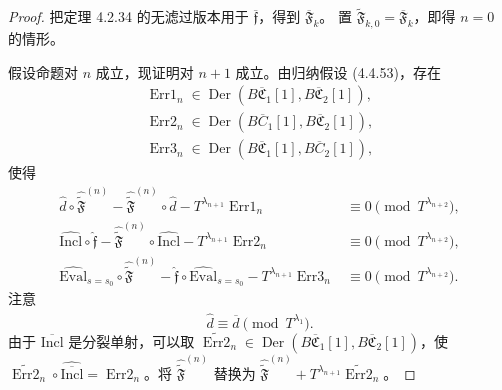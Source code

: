 \begin{proof}
把定理 4.2.34 的无滤过版本用于
$\overline{\mathfrak f}$，得到 $\overline{\mathfrak F}_k$。
置 $\widetilde{\mathfrak F}_{k,0}=\overline{\mathfrak F}_k$，即得
$n=0$ 的情形。

假设命题对 $n$ 成立，现证明对 $n+1$ 成立。由归纳假设
(4.4.53)，存在
\[
 \begin{gathered}
 \operatorname{Err1}_n\in
 \operatorname{Der}(B\overline{\mathfrak C}_1[1],
 B\overline{\mathfrak C}_2[1]),\\
 \operatorname{Err2}_n\in
 \operatorname{Der}(B\overline C_1[1],
 B\overline{\mathfrak C}_2[1]),\\
 \operatorname{Err3}_n\in
 \operatorname{Der}(B\overline{\mathfrak C}_1[1],
 B\overline C_2[1]),
 \end{gathered}
\]
使得
\begin{align}
 \widehat d\circ\widehat{\widetilde{\mathfrak F}}^{(n)}
 -\widehat{\widetilde{\mathfrak F}}^{(n)}\circ\widehat d
 -T^{\lambda_{n+1}}\operatorname{Err1}_n
 &\equiv0\pmod{T^{\lambda_{n+2}}},
 \tag{4.4.54.1}\label{eq:4-4-54-1}\\
 \widehat{\mathrm{Incl}}\circ\widehat{\mathfrak f}
 -\widehat{\widetilde{\mathfrak F}}^{(n)}
 \circ\widehat{\mathrm{Incl}}
 -T^{\lambda_{n+1}}\operatorname{Err2}_n
 &\equiv0\pmod{T^{\lambda_{n+2}}},
 \tag{4.4.54.2}\label{eq:4-4-54-2}\\
 \widehat{\mathrm{Eval}}_{s=s_0}
 \circ\widehat{\widetilde{\mathfrak F}}^{(n)}
 -\widehat{\mathfrak f}\circ
 \widehat{\mathrm{Eval}}_{s=s_0}
 -T^{\lambda_{n+1}}\operatorname{Err3}_n
 &\equiv0\pmod{T^{\lambda_{n+2}}}.
 \tag{4.4.54.3}\label{eq:4-4-54-3}
\end{align}
注意
\begin{equation}
 \widehat d\equiv\widehat{\overline d}
 \pmod{T^{\lambda_1}}.
\tag{4.4.55}\label{eq:4-4-55}
\end{equation}
由于 $\overline{\mathrm{Incl}}$ 是分裂单射，可以取
$\widetilde{\operatorname{Err2}}_n\in
\operatorname{Der}(B\overline{\mathfrak C}_1[1],
B\overline{\mathfrak C}_2[1])$，使
$\widetilde{\operatorname{Err2}}_n
\circ\widehat{\overline{\mathrm{Incl}}}
=\operatorname{Err2}_n$。将
$\widehat{\widetilde{\mathfrak F}}^{(n)}$ 替换为
$\widehat{\widetilde{\mathfrak F}}^{(n)}
+T^{\lambda_{n+1}}\widetilde{\operatorname{Err2}}_n$。

\end{proof}
